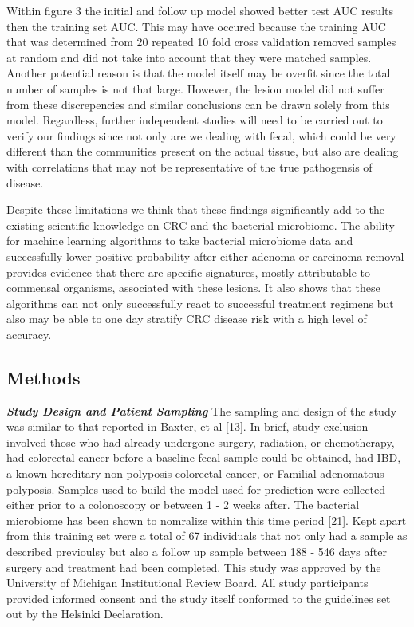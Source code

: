 \documentclass[12pt,]{article}
\begin{document}
Within figure 3 the initial and follow up model showed better test AUC
results then the training set AUC. This may have occured because the
training AUC that was determined from 20 repeated 10 fold cross
validation removed samples at random and did not take into account that
they were matched samples. Another potential reason is that the model
itself may be overfit since the total number of samples is not that
large. However, the lesion model did not suffer from these discrepencies
and similar conclusions can be drawn solely from this model. Regardless,
further independent studies will need to be carried out to verify our
findings since not only are we dealing with fecal, which could be very
different than the communities present on the actual tissue, but also
are dealing with correlations that may not be representative of the true
pathogensis of disease.

Despite these limitations we think that these findings significantly add
to the existing scientific knowledge on CRC and the bacterial
microbiome. The ability for machine learning algorithms to take
bacterial microbiome data and successfully lower positive probability
after either adenoma or carcinoma removal provides evidence that there
are specific signatures, mostly attributable to commensal organisms,
associated with these lesions. It also shows that these algorithms can
not only successfully react to successful treatment regimens but also
may be able to one day stratify CRC disease risk with a high level of
accuracy.

\newpage

\subsection{Methods}\label{methods}

\textbf{\emph{Study Design and Patient Sampling}} The sampling and
design of the study was similar to that reported in Baxter, et al
{[}13{]}. In brief, study exclusion involved those who had already
undergone surgery, radiation, or chemotherapy, had colorectal cancer
before a baseline fecal sample could be obtained, had IBD, a known
hereditary non-polyposis colorectal cancer, or Familial adenomatous
polyposis. Samples used to build the model used for prediction were
collected either prior to a colonoscopy or between 1 - 2 weeks after.
The bacterial microbiome has been shown to nomralize within this time
period {[}21{]}. Kept apart from this training set were a total of 67
individuals that not only had a sample as described previoulsy but also
a follow up sample between 188 - 546 days after surgery and treatment
had been completed. This study was approved by the University of
Michigan Institutional Review Board. All study participants provided
informed consent and the study itself conformed to the guidelines set
out by the Helsinki Declaration.
\end{document}
